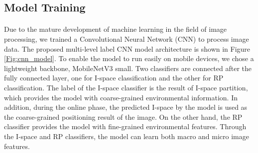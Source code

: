 \documentclass[a4paper,12pt]{report}
\begin{document}
\subsection{Model Training}
\paragraph{}
Due to the mature development of machine learning in the field of image processing, we trained a Convolutional Neural Network (CNN) to process image data. The proposed multi-level label CNN model architecture is shown in Figure \ref{Fig:cnn_model}. To enable the model to run easily on mobile devices, we chose a lightweight backbone, MobileNetV3 small. Two classifiers are connected after the fully connected layer, one for I-space classification and the other for RP classification. The label of the I-space classifier is the result of I-space partition, which provides the model with coarse-grained environmental information. In addition, during the online phase, the predicted I-space by the model is used as the coarse-grained positioning result of the image. On the other hand, the RP classifier provides the model with fine-grained environmental features. Through the I-space and RP classifiers, the model can learn both macro and micro image features.
\end{document}
